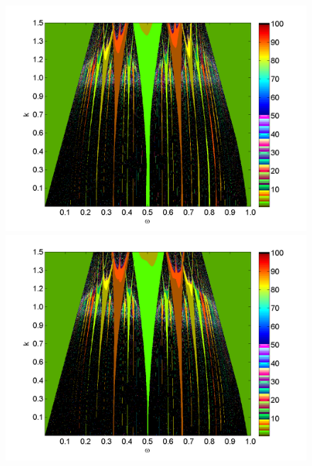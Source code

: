 \begin{figure}[H]
\includegraphics[width=.5\textwidth]{figs/tongues_1000_L_07.png}\hfill
\includegraphics[width=.5\textwidth]{figs/tongues_1000_L_09.png}\\
\end{figure}


